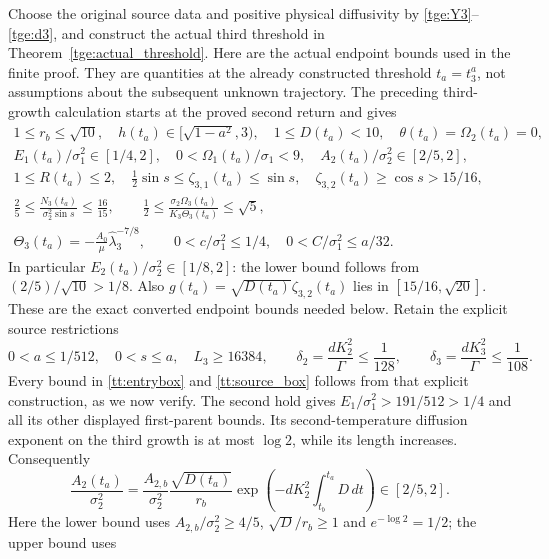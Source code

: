 Choose the original source data and positive physical diffusivity by
\eqref{tge:Y3}--\eqref{tge:d3}, and construct the actual third threshold
in Theorem~\ref{tge:actual_threshold}.
Here are the actual endpoint bounds used in the finite proof. They are
quantities at the already constructed threshold $t_a=t_3^a$, not
assumptions about the subsequent unknown trajectory. The preceding
third-growth calculation starts at the proved second return and gives
\begin{equation}\label{tt:entrybox}
\begin{gathered}
 1\leq r_b\leq\sqrt{10},\quad
 h(t_a)\in[\sqrt{1-a^2},3),\quad 1\leq D(t_a)<10,\quad
 \theta(t_a)=\Omega_2(t_a)=0,\\
 E_1(t_a)/\sigma_1^2\in[1/4,2],\quad
 0<\Omega_1(t_a)/\sigma_1<9,\quad
 A_2(t_a)/\sigma_2^2\in[2/5,2],\\
 1\leq R(t_a)\leq2,\quad
 \tfrac12\sin s\leq\zeta_{3,1}(t_a)\leq\sin s,\quad
 \zeta_{3,2}(t_a)\geq\cos s>15/16,\\
 \frac25\leq\frac{N_3(t_a)}{\sigma_2^2\sin s}\leq\frac{16}{15},
 \qquad \frac12\leq
 \frac{\sigma_2\Omega_3(t_a)}{K_3\Theta_3(t_a)}\leq\sqrt5,\\
 \Theta_3(t_a)=-\frac{A_0}{\mu}\widehat\lambda_3^{-7/8},\qquad
 0<c/\sigma_1^2\leq1/4,\quad
 0<C/\sigma_1^2\leq a/32.
\end{gathered}
\end{equation}
In particular $E_2(t_a)/\sigma_2^2\in[1/8,2]$:
the lower bound follows from $(2/5)/\sqrt{10}>1/8$.
Also $g(t_a)=\sqrt{D(t_a)}\zeta_{3,2}(t_a)$ lies in
$[15/16,\sqrt{20}]$. These are the exact converted endpoint
bounds needed below. Retain the explicit source restrictions
\begin{equation}\label{tt:source_box}
 0<a\leq1/512,\quad 0<s\leq a,\quad L_3\geq16384,
 \qquad \delta_2=\frac{dK_2^2}{\Gamma}\leq\frac1{128},
 \qquad \delta_3=\frac{dK_3^2}{\Gamma}\leq\frac1{108}.
\end{equation}
Every bound in \eqref{tt:entrybox} and \eqref{tt:source_box} follows
from that explicit construction, as we now verify. The second hold
gives $E_1/\sigma_1^2>191/512>1/4$ and all its other displayed
first-parent bounds. Its second-temperature diffusion exponent on
the third growth is at most $\log2$, while its length increases.
Consequently
\[
 \frac{A_2(t_a)}{\sigma_2^2}
 =\frac{A_{2,b}}{\sigma_2^2}
    \frac{\sqrt{D(t_a)}}{r_b}
    \exp\!\left(-dK_2^2\int_{t_b}^{t_a}D\,dt\right)
 \in[2/5,2].
\]
Here the lower bound uses $A_{2,b}/\sigma_2^2\geq4/5$,
$\sqrt D/r_b\geq1$ and $e^{-\log2}=1/2$; the upper bound uses
